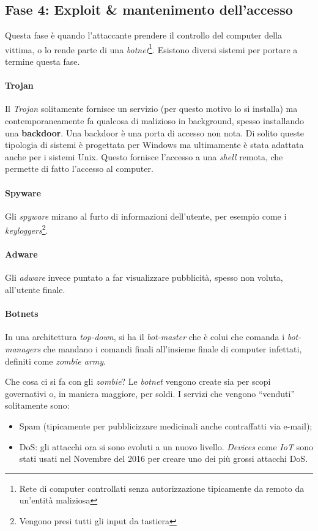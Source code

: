 \subsection{Fase 4: Exploit \& mantenimento dell'accesso}

Questa fase è quando l'attaccante prendere il controllo del computer della 
vittima, o lo rende parte di una \textit{botnet}\footnote{Rete di computer 
controllati senza autorizzazione tipicamente da remoto da un'entità maliziosa}. 
Esistono diversi sistemi per portare a termine questa fase.

\paragraph*{Trojan} Il \textit{Trojan} solitamente fornisce un servizio (per 
questo motivo lo si installa) ma contemporaneamente fa qualcosa di malizioso in 
background, spesso installando una \textbf{backdoor}.
Una backdoor è una porta di accesso non nota. Di solito queste tipologia di 
sistemi è progettata per Windows ma ultimamente è stata adattata anche per i 
sistemi Unix. Questo fornisce l'accesso a una \textit{shell} remota, che 
permette di fatto l'accesso al computer.

\paragraph*{Spyware} Gli \textit{spyware} mirano al furto di informazioni 
dell'utente, per esempio come i \textit{keyloggers}\footnote{Vengono presi tutti 
gli input da tastiera}. 

\paragraph*{Adware} Gli \textit{adware} invece puntato a far visualizzare 
pubblicità, spesso non voluta, all'utente finale.

\paragraph*{Botnets}

In una architettura \textit{top-down}, si ha il \textit{bot-master} che è colui 
che comanda i \textit{bot-managers} che mandano i comandi finali all'insieme 
finale di computer infettati, definiti come \textit{zombie army}.

Che cosa ci si fa con gli \textit{zombie}? Le \textit{botnet} vengono create 
sia per scopi governativi o, in maniera maggiore, per soldi. I servizi che 
vengono ``venduti'' solitamente sono:
\begin{itemize}
\item Spam (tipicamente per pubblicizzare medicinali anche contraffatti via 
e-mail);
\item DoS: gli attacchi ora si sono evoluti a un nuovo livello. \textit{Devices} 
come \textit{IoT} sono stati usati nel Novembre del 2016 per creare uno dei più 
grossi attacchi DoS.
\end{itemize}

